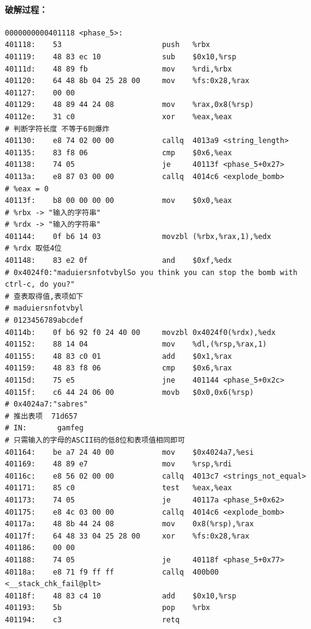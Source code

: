 \paragraph{破解过程：}

\begin{verbatim}
0000000000401118 <phase_5>:
401118:    53                       push   %rbx
401119:    48 83 ec 10              sub    $0x10,%rsp
40111d:    48 89 fb                 mov    %rdi,%rbx
401120:    64 48 8b 04 25 28 00     mov    %fs:0x28,%rax
401127:    00 00 
401129:    48 89 44 24 08           mov    %rax,0x8(%rsp)
40112e:    31 c0                    xor    %eax,%eax
# 判断字符长度 不等于6则爆炸
401130:    e8 74 02 00 00           callq  4013a9 <string_length>
401135:    83 f8 06                 cmp    $0x6,%eax
401138:    74 05                    je     40113f <phase_5+0x27>
40113a:    e8 87 03 00 00           callq  4014c6 <explode_bomb>
# %eax = 0
40113f:    b8 00 00 00 00           mov    $0x0,%eax
# %rbx -> "输入的字符串"
# %rdx -> "输入的字符串"
401144:    0f b6 14 03              movzbl (%rbx,%rax,1),%edx
# %rdx 取低4位
401148:    83 e2 0f                 and    $0xf,%edx
# 0x4024f0:"maduiersnfotvbylSo you think you can stop the bomb with ctrl-c, do you?"
# 查表取得值,表项如下
# maduiersnfotvbyl
# 0123456789abcdef
40114b:    0f b6 92 f0 24 40 00     movzbl 0x4024f0(%rdx),%edx
401152:    88 14 04                 mov    %dl,(%rsp,%rax,1)
401155:    48 83 c0 01              add    $0x1,%rax
401159:    48 83 f8 06              cmp    $0x6,%rax
40115d:    75 e5                    jne    401144 <phase_5+0x2c>
40115f:    c6 44 24 06 00           movb   $0x0,0x6(%rsp)
# 0x4024a7:"sabres"
# 推出表项  71d657
# IN:       gamfeg
# 只需输入的字母的ASCII码的低8位和表项值相同即可
401164:    be a7 24 40 00           mov    $0x4024a7,%esi
401169:    48 89 e7                 mov    %rsp,%rdi
40116c:    e8 56 02 00 00           callq  4013c7 <strings_not_equal>
401171:    85 c0                    test   %eax,%eax
401173:    74 05                    je     40117a <phase_5+0x62>
401175:    e8 4c 03 00 00           callq  4014c6 <explode_bomb>
40117a:    48 8b 44 24 08           mov    0x8(%rsp),%rax
40117f:    64 48 33 04 25 28 00     xor    %fs:0x28,%rax
401186:    00 00 
401188:    74 05                    je     40118f <phase_5+0x77>
40118a:    e8 71 f9 ff ff           callq  400b00 <__stack_chk_fail@plt>
40118f:    48 83 c4 10              add    $0x10,%rsp
401193:    5b                       pop    %rbx
401194:    c3                       retq   
\end{verbatim}

